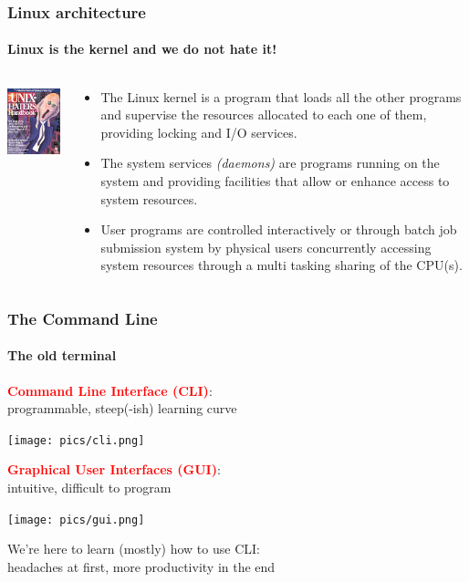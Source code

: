 \documentclass[unknownkeysallowed, 10pt, a4 paper, handout]{beamer}
\newcommand{\focus}[1]{\textbf{\textcolor{red}{#1}}}
\newcommand{\sidebyside}[5]{
  \begin{minipage}{#1\textwidth}
    #2
  \end{minipage} #3 \begin{minipage}{#4\textwidth}
    #5
  \end{minipage}
}
\begin{document}
\begin{frame}[label=architecture]
  \frametitle{Linux architecture}
  \framesubtitle{Linux is the kernel and we do not hate it!}
  \begin{columns}[T]
    \begin{column}{.23\textwidth}
      \vspace{7mm}
      \includegraphics[scale=0.5]{pics/UNIX-HATERS_Handbook_cover_ISBN_1-56884-203-1.png}
    \end{column}
    \begin{column}{.73\textwidth}
      \begin{itemize}
      \item The Linux kernel is a program that loads all the other programs and
        supervise the resources allocated to each one of them, providing
        locking and I/O services.
      \item The system services \emph{(daemons)} are programs running on the
        system and providing facilities that allow or enhance access to system
        resources.
      \item User programs are controlled interactively or through batch job
        submission system by physical users concurrently accessing system
        resources through a multi tasking sharing of the CPU(s).
    \end{itemize}
    \end{column}
  \end{columns}
\end{frame}


\begin{frame}[c]
  \begin{center}
    \frametitle{The Command Line}
    \framesubtitle{The old terminal}

    \sidebyside{0.54}{
      \focus{Command Line Interface (CLI)}:\\
             programmable, steep(-ish) learning curve
    }{\hfill}{0.41}{
      \texttt{[image: pics/cli.png]}
    }

    \sidebyside{0.54}{
      \focus{Graphical User Interfaces (GUI)}:\\
      intuitive, difficult to program
    }{\hfill}{0.41}{
      \texttt{[image: pics/gui.png]}
    }

    \vspace{-2mm}

    We're here to learn (mostly) how to use CLI:\\
    headaches at first, more productivity in the end

  \end{center}
\end{frame}
\end{document}
